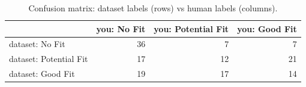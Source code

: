 \begin{table}
\caption{Confusion matrix: dataset labels (rows) vs human labels (columns).}
\label{tab:t7b_confusion}
\begin{tabular}{lrrr}
\toprule
 & you: No Fit & you: Potential Fit & you: Good Fit \\
\midrule
dataset: No Fit & 36 & 7 & 7 \\
dataset: Potential Fit & 17 & 12 & 21 \\
dataset: Good Fit & 19 & 17 & 14 \\
\bottomrule
\end{tabular}
\end{table}
